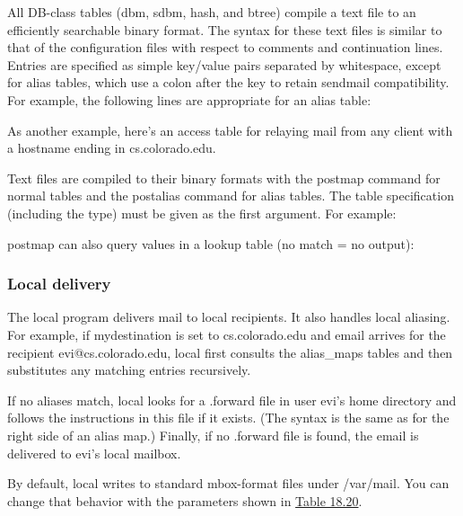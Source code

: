 All DB-class tables ({dbm}, {sdbm}, {hash}, and {btree}) compile a text
file to an {efficiently} searchable binary format. The syntax for these
text files is similar to that of the configuration files with respect to
comments and continuation lines. Entries are specified as simple
key/value pairs separated by whitespace, except for alias tables, which
use a colon after the key to retain {sendmail} compatibility. For
example, the following lines are appropriate for an alias table:


As another example, here's an access table for relaying mail from any
client with a hostname ending in cs.colorado.edu.


Text files are compiled to their binary formats with the {postmap}
command for normal tables and the {postalias} command for alias tables.
The table specification (including the type) must be given as the first
argument. For example:


{postmap} can also query values in a lookup table (no match = no
output):


\subsubsection[Local
delivery]{\texorpdfstring{\protect\hypertarget{part0026_split_061.htmlux5cux23_idTextAnchor1180}{}{}Local
delivery}{Local delivery}}

The
\protect\hypertarget{part0026_split_061.htmlux5cux23_idIndexMarker2716}{}{}{local}
program delivers mail to local recipients. It also handles local
aliasing. For example, if {mydestination }is set to cs.colorado.edu and
email arrives for the recipient evi@cs.colorado.edu, {local} first
consults the {alias\_maps} tables and then substitutes any matching
entries recursively.

If no aliases match, {local} looks for a
\protect\hypertarget{part0026_split_061.htmlux5cux23_idIndexMarker2717}{}{}{.forward}
file in user evi's home directory and follows the instructions in this
file if it exists. (The syntax is the same as for the right side of an
alias map.) Finally, if no {.forward} file is found, the email is
delivered to evi's local mailbox.

By default, {local} writes to standard {mbox}-format files under
{/var/mail}. You can change that behavior with the parameters shown in
\protect\hyperlink{part0026_split_061.htmlux5cux23_idTextAnchor1181}{Table
18.20}.

